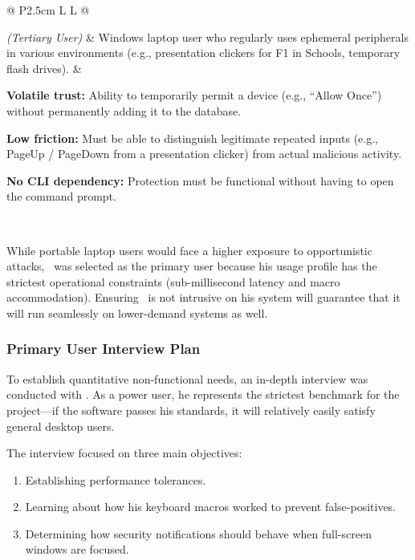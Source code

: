 {\begin{xltabular}{\textwidth}{@{} P{2.5cm} L L @{}}
		\textbf{\stakeholdersTU}\par
		\textit{\footnotesize (Tertiary User)} &
		Windows laptop user who regularly uses ephemeral peripherals in various environments (e.g., presentation clickers for F1 in Schools, temporary flash drives). &
		\begin{tablelist}
			\item \textbf{Volatile trust:} Ability to temporarily permit a device (e.g., ``Allow Once'') without permanently adding it to the database.
			\item \textbf{Low friction:} Must be able to distinguish legitimate repeated inputs (e.g., PageUp / PageDown from a presentation clicker) from actual malicious activity.
			\item \textbf{No CLI dependency:} Protection must be functional without having to open the command prompt.
		\end{tablelist} \\
	\end{xltabular}
}
\begin{note}
	While portable laptop users would face a higher exposure to opportunistic attacks, \stakeholdersPU\ was selected as the primary user because his usage profile has the strictest operational constraints (sub-millisecond latency and macro accommodation). Ensuring \projectNameFormatted\ is not intrusive on his system will guarantee that it will run seamlessly on lower-demand systems as well.
\end{note}

\subsubsection{Primary User Interview Plan}

To establish quantitative non-functional needs, an in-depth interview was conducted with \stakeholdersPU. As a power user, he represents the strictest benchmark for the project---if the software passes his standards, it will relatively easily satisfy general desktop users.

The interview focused on three main objectives:

\begin{enumerate}
	\item Establishing performance tolerances.
	\item Learning about how his keyboard macros worked to prevent false-positives.
	\item Determining how security notifications should behave when full-screen windows are focused.
\end{enumerate}

